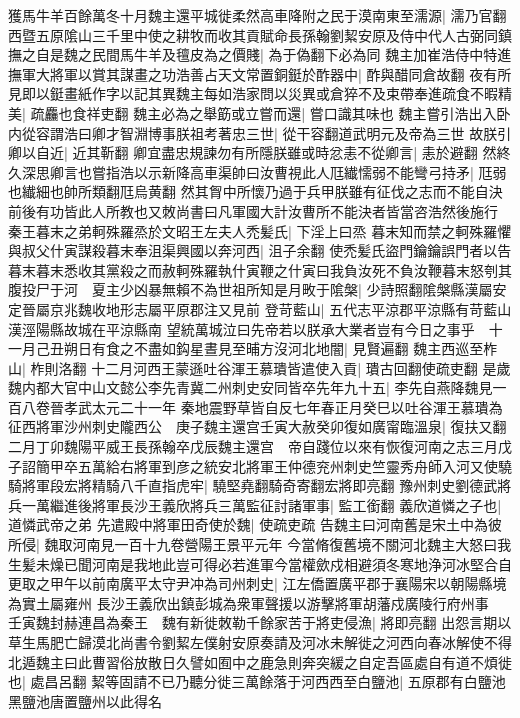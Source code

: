 獲馬牛羊百餘萬冬十月魏主還平城徙柔然高車降附之民于漠南東至濡源|{
	濡乃官翻}
西暨五原隂山三千里中使之耕牧而收其貢賦命長孫翰劉絜安原及侍中代人古弼同鎮撫之自是魏之民間馬牛羊及氊皮為之價賤|{
	為于偽翻下必為同}
魏主加崔浩侍中特進撫軍大將軍以賞其謀畫之功浩善占天文常置銅鋌於酢器中|{
	酢與醋同倉故翻}
夜有所見即以鋌畫紙作字以記其異魏主每如浩家問以災異或倉猝不及束帶奉進疏食不暇精美|{
	疏麤也食祥吏翻}
魏主必為之舉筯或立嘗而還|{
	嘗口識其味也}
魏主嘗引浩出入卧内從容謂浩曰卿才智淵博事朕祖考著忠三世|{
	從干容翻道武明元及帝為三世}
故朕引卿以自近|{
	近其靳翻}
卿宜盡忠規諫勿有所隱朕雖或時忿恚不從卿言|{
	恚於避翻}
然終久深思卿言也嘗指浩以示新降高車渠帥曰汝曹視此人尫纎懦弱不能彎弓持矛|{
	尫弱也纎細也帥所類翻尫烏黄翻}
然其胷中所懷乃過于兵甲朕雖有征伐之志而不能自決前後有功皆此人所教也又敇尚書曰凡軍國大計汝曹所不能決者皆當咨浩然後施行　秦王暮末之弟軻殊羅烝於文昭王左夫人禿髪氏|{
	下淫上曰烝}
暮末知而禁之軻殊羅懼與叔父什寅謀殺暮末奉沮渠興國以奔河西|{
	沮子余翻}
使禿髪氏盜門鑰鑰誤門者以告暮末暮末悉收其黨殺之而赦軻殊羅執什寅鞭之什寅曰我負汝死不負汝鞭暮末怒刳其腹投尸于河　夏主少凶暴無賴不為世祖所知是月畋于隂槃|{
	少詩照翻隂槃縣漢屬安定晉屬京兆魏收地形志屬平原郡注又見前}
登苛藍山|{
	五代志平涼郡平涼縣有苛藍山漢涇陽縣故城在平涼縣南}
望統萬城泣曰先帝若以朕承大業者豈有今日之事乎　十一月己丑朔日有食之不盡如鈎星晝見至晡方沒河北地闇|{
	見賢遍翻}
魏主西巡至柞山|{
	柞則洛翻}
十二月河西王蒙遜吐谷渾王慕璝皆遣使入貢|{
	璝古回翻使疏吏翻}
是歲魏内都大官中山文懿公李先青冀二州刺史安同皆卒先年九十五|{
	李先自燕降魏見一百八卷晉孝武太元二十一年}
秦地震野草皆自反七年春正月癸巳以吐谷渾王慕璝為征西將軍沙州刺史隴西公　庚子魏主還宫壬寅大赦癸卯復如廣甯臨溫泉|{
	復扶又翻}
二月丁卯魏陽平威王長孫翰卒戊辰魏主還宫　帝自踐位以來有恢復河南之志三月戊子詔簡甲卒五萬給右將軍到彦之統安北將軍王仲德兖州刺史竺靈秀舟師入河又使驍騎將軍段宏將精騎八千直指虎牢|{
	驍堅堯翻騎奇寄翻宏將即亮翻}
豫州刺史劉德武將兵一萬繼進後將軍長沙王義欣將兵三萬監征討諸軍事|{
	監工銜翻}
義欣道憐之子也|{
	道憐武帝之弟}
先遣殿中將軍田奇使於魏|{
	使疏吏疏}
告魏主曰河南舊是宋土中為彼所侵|{
	魏取河南見一百十九卷營陽王景平元年}
今當脩復舊境不關河北魏主大怒曰我生髪未燥已聞河南是我地此豈可得必若進軍今當權歛戍相避須冬寒地浄河冰堅合自更取之甲午以前南廣平太守尹冲為司州刺史|{
	江左僑置廣平郡于襄陽宋以朝陽縣境為實土屬雍州}
長沙王義欣出鎮彭城為衆軍聲援以游擊將軍胡藩戍廣陵行府州事　壬寅魏封赫連昌為秦王　魏有新徙敇勒千餘家苦于將吏侵漁|{
	將即亮翻}
出怨言期以草生馬肥亡歸漠北尚書令劉絜左僕射安原奏請及河冰未解徙之河西向春冰解使不得北遁魏主曰此曹習俗放散日久譬如囿中之鹿急則奔突緩之自定吾區處自有道不煩徙也|{
	處昌呂翻}
絜等固請不已乃聽分徙三萬餘落于河西西至白鹽池|{
	五原郡有白鹽池黑鹽池唐置鹽州以此得名}
